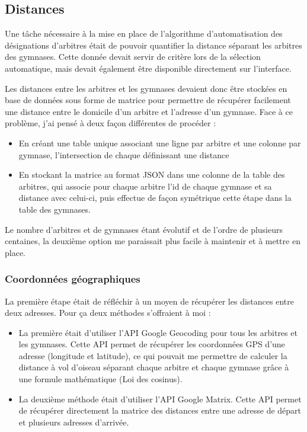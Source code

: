 \subsection{Distances}
\vspace{1cm}

Une tâche nécessaire à la mise en place de l’algorithme d’automatisation des désignations d’arbitres était de pouvoir quantifier la distance séparant les arbitres des gymnases. Cette donnée devait servir de critère lors de la sélection automatique, mais devait également être disponible directement sur l’interface. 

Les distances entre les arbitres et les gymnases devaient donc être stockées en base de données sous forme de matrice pour permettre de récupérer facilement une distance entre le domicile d’un arbitre et l’adresse d’un gymnase.
Face à ce problème, j’ai pensé à deux façon différentes de procéder : 
\begin{itemize}
    \item En créant une table unique associant une ligne par arbitre et une colonne par gymnase, l’intersection de chaque définissant une distance
    \item En stockant la matrice au format JSON dans une colonne de la table des arbitres, qui associe pour chaque arbitre l’id de chaque gymnase et sa distance avec celui-ci, puis effectue de façon symétrique cette étape dans la table des gymnases.
\end{itemize}

Le nombre d’arbitres et de gymnases étant évolutif et de l’ordre de plusieurs centaines, la deuxième option me paraissait plus facile à maintenir et à mettre en place.

\subsubsection{Coordonnées géographiques}
\vspace{1cm}

La première étape était de réfléchir à un moyen de récupérer les distances entre deux adresses. Pour ça deux méthodes s’offraient à moi :
\begin{itemize}
    \item La première était d’utiliser l’API Google Geocoding pour tous les arbitres et les gymnases. Cette API permet de récupérer les coordonnées GPS d’une adresse (longitude et latitude), ce qui pouvait me permettre de calculer la distance à vol d’oiseau séparant chaque arbitre et chaque gymnase grâce à une formule mathématique (Loi des cosinus).
    \item La deuxième méthode était d’utiliser l’API Google Matrix. Cette API permet de récupérer directement la matrice des distances entre une adresse de départ et plusieurs adresses d’arrivée.
\end{itemize}

